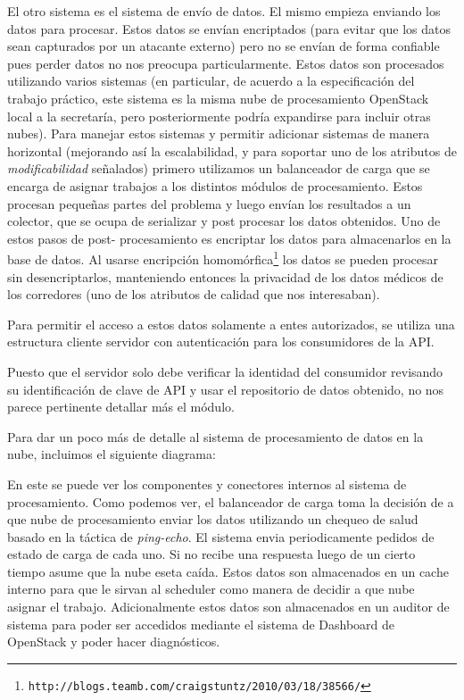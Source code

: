 El otro sistema es el sistema de envío de datos. El mismo empieza enviando
los datos para procesar. Estos datos se envían encriptados (para evitar que
los datos sean capturados por un atacante externo) pero no se envían de forma
confiable pues perder datos no nos preocupa particularmente. Estos datos
son procesados utilizando varios sistemas (en particular, de acuerdo a la
especificación del trabajo práctico, este sistema es la misma nube de 
procesamiento OpenStack local a la secretaría, pero posteriormente podría
expandirse para incluir otras nubes). Para manejar estos sistemas y permitir
adicionar sistemas de manera horizontal (mejorando así la escalabilidad, y
para soportar uno de los atributos de \textit{modificabilidad} señalados)
primero utilizamos un balanceador de carga que se encarga de asignar trabajos
a los distintos módulos de procesamiento. Estos procesan pequeñas partes
del problema y luego envían los resultados a un colector, que se ocupa de
serializar y post procesar los datos obtenidos. Uno de estos pasos de post-
procesamiento es encriptar los datos para almacenarlos en la base de datos.
Al usarse encripción homomórfica\footnote{\texttt{http://blogs.teamb.com/craigstuntz/2010/03/18/38566/}} los datos se pueden procesar sin desencriptarlos,
manteniendo entonces la privacidad de los datos médicos de los corredores
(uno de los atributos de calidad que nos interesaban). 

Para permitir el acceso a estos datos solamente a entes autorizados, se 
utiliza una estructura cliente servidor con autenticación para los 
consumidores de la API. 

Puesto que el servidor solo debe verificar la 
identidad del consumidor revisando su identificación de clave de API y usar
el repositorio de datos obtenido, no nos parece pertinente detallar más el
módulo.

Para dar un poco más de detalle al sistema de procesamiento de datos en
la nube, incluimos el siguiente diagrama:


En este se puede ver los componentes y conectores internos al sistema de
procesamiento. Como podemos ver, el balanceador de carga toma la decisión
de a que nube de procesamiento enviar los datos utilizando un chequeo de
salud basado en la táctica de \textit{ping-echo}. El sistema envia 
periodicamente pedidos de estado de carga de cada uno. Si no recibe una
respuesta luego de un cierto tiempo asume que la nube eseta caída. Estos
datos son almacenados en un cache interno para que le sirvan al scheduler 
como manera de decidir a que nube asignar el trabajo. Adicionalmente estos
datos son almacenados en un auditor de sistema para poder ser accedidos
mediante el sistema de Dashboard de OpenStack y poder hacer diagnósticos.

